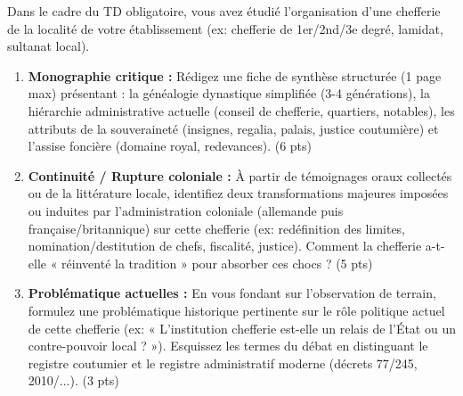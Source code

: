 \documentclass[11pt]{article}
\begin{document}
\begin{exercice}
\label{exo:terrain}
Dans le cadre du TD obligatoire, vous avez étudié l'organisation d'une chefferie de la localité de votre établissement (ex: chefferie de 1er/2nd/3e degré, lamidat, sultanat local).

\begin{enumerate}
    \item \textbf{Monographie critique :} Rédigez une fiche de synthèse structurée (1 page max) présentant : la généalogie dynastique simplifiée (3-4 générations), la hiérarchie administrative actuelle (conseil de chefferie, quartiers, notables), les attributs de la souveraineté (insignes, regalia, palais, justice coutumière) et l'assise foncière (domaine royal, redevances). \hfill (6 pts)
    
    \item \textbf{Continuité / Rupture coloniale :} À partir de témoignages oraux collectés ou de la littérature locale, identifiez deux transformations majeures imposées ou induites par l'administration coloniale (allemande puis française/britannique) sur cette chefferie (ex: redéfinition des limites, nomination/destitution de chefs, fiscalité, justice). Comment la chefferie a-t-elle « réinventé la tradition » pour absorber ces chocs ? \hfill (5 pts)
    
    \item \textbf{Problématique actuelles :} En vous fondant sur l'observation de terrain, formulez une problématique historique pertinente sur le rôle politique actuel de cette chefferie (ex: « L'institution chefferie est-elle un relais de l'État ou un contre-pouvoir local ? »). Esquissez les termes du débat en distinguant le registre coutumier et le registre administratif moderne (décrets 77/245, 2010/...). \hfill (3 pts)
\end{enumerate}
\end{exercice}
\end{document}
